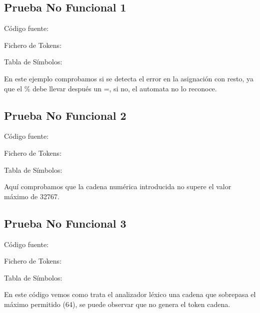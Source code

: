 \documentclass{article}[a4paper]
\begin{document}
\begin{appendices}
\subsection{Prueba No Funcional 1}
Código fuente:

\hspace{\parindent} Fichero de Tokens:

\hspace{\parindent} Tabla de Símbolos:

\hspace{\parindent} En este ejemplo comprobamos si se detecta el error en la asignación con resto, ya que el \% debe llevar después un =, si no, el automata no lo reconoce.

\subsection{Prueba No Funcional 2}
Código fuente:

\hspace{\parindent} Fichero de Tokens:

\hspace{\parindent} Tabla de Símbolos:

\hspace{\parindent} Aquí comprobamos que la cadena numérica introducida no supere el valor máximo de 32767.

\subsection{Prueba No Funcional 3}
Código fuente:

\hspace{\parindent} Fichero de Tokens:

\hspace{\parindent} Tabla de Símbolos:

\hspace{\parindent} En este código vemos como trata el analizador léxico una cadena que sobrepasa el máximo permitido (64), se puede observar que no genera el token cadena.

\end{appendices}
\end{document}
